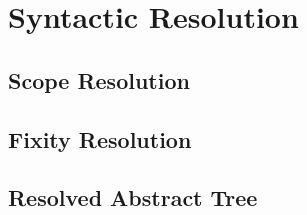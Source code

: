 \chapter{Syntactic Resolution}

\section{Scope Resolution}



\section{Fixity Resolution}

\section{Resolved Abstract Tree}
